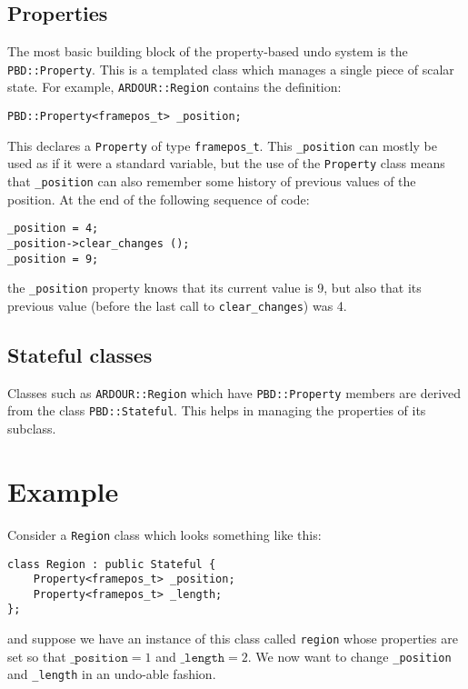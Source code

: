 \documentclass[10pt,a4paper]{book}
\newcommand{\code}[1]{\texttt{#1}}
\begin{document}
\subsection{Properties}

The most basic building block of the property-based undo system is the
\code{PBD::Property}.  This is a templated class which manages a
single piece of scalar state.  For example, \code{ARDOUR::Region}
contains the definition:

\begin{lstlisting}
PBD::Property<framepos_t> _position;
\end{lstlisting}

This declares a \code{Property} of type \code{framepos\_t}.  This
\code{\_position} can mostly be used as if it were a standard
variable, but the use of the \code{Property} class means that
\code{\_position} can also remember some history of previous values of
the position.  At the end of the following sequence of code:

\begin{lstlisting}
_position = 4;
_position->clear_changes ();
_position = 9;
\end{lstlisting}

the \code{\_position} property knows that its current value is 9, but
also that its previous value (before the last call to
\code{clear\_changes}) was 4.

\subsection{Stateful classes}

Classes such as \code{ARDOUR::Region} which have \code{PBD::Property}
members are derived from the class \code{PBD::Stateful}.  This helps
in managing the properties of its subclass.

\section{Example}

Consider a \code{Region} class which looks something like this:

\begin{lstlisting}
class Region : public Stateful {
    Property<framepos_t> _position;
    Property<framepos_t> _length;
};
\end{lstlisting}

and suppose we have an instance of this class called \code{region}
whose properties are set so that $\code{\_position} = 1$ and
$\code{\_length} = 2$.  We now want to change \code{\_position} and
\code{\_length} in an undo-able fashion.
\end{document}
